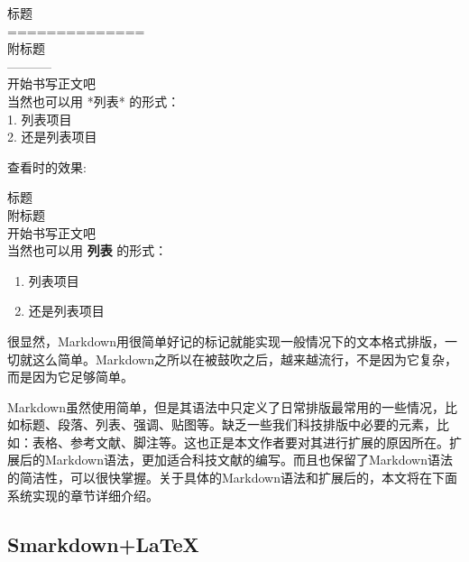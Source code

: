 \begin{bframe}
  \noindent 
  标题\\
  ==============\\
  附标题\\
  -----------\\
  开始书写正文吧\\
  当然也可以用 *列表* 的形式：\\
  1.   列表项目\\
  2.   还是列表项目\\
\end{bframe}
{\noindent 查看时的效果:}
\begin{bframe}
  \noindent
  {\erhao 标题}\\
  {\sanhao 附标题}\\
  开始书写正文吧\\
  当然也可以用 {\bfseries 列表} 的形式：
  \begin{enumerate}
  \item 列表项目
  \item 还是列表项目
  \end{enumerate}
\end{bframe}
很显然，Markdown用很简单好记的标记就能实现一般情况下的文本格式排版，一切就这么简单。Markdown之所以在被鼓吹之后，越来越流行，不是因为它复杂，而是因为它足够简单。

Markdown虽然使用简单，但是其语法中只定义了日常排版最常用的一些情况，比如标题、段落、列表、强调、贴图等。缺乏一些我们科技排版中必要的元素，比如：表格、参考文献、脚注等。这也正是本文作者要对其进行扩展的原因所在。扩展后的Markdown语法，更加适合科技文献的编写。而且也保留了Markdown语法的简洁性，可以很快掌握。关于具体的Markdown语法和扩展后的，本文将在下面系统实现的章节详细介绍。

\subsection{Smarkdown+LaTeX}
\label{sec:sandl}

